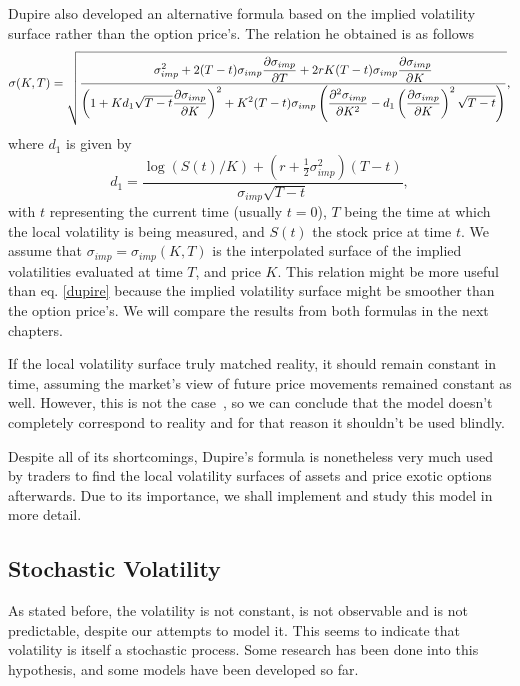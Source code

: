 Dupire also developed an alternative formula based on the implied volatility surface rather than the option price's.
The relation he obtained is as follows
\begin{equation}\label{dupire2}
\sigma(K,T)=\sqrt{\frac{\displaystyle\sigma_{imp}^2+2(T-t)\sigma_{imp}\pdv{\sigma_{imp}}{T}+2rK(T-t)\sigma_{imp}\pdv{\sigma_{imp}}{K}}{\displaystyle\left(1+Kd_1\sqrt{T-t}\pdv{\sigma_{imp}}{K}\right)^2+K^2(T-t)\sigma_{imp}\left(\pdv{^2\sigma_{imp}}{K^2}-d_1\left(\pdv{\sigma_{imp}}{K}\right)^2\sqrt{T-t}\right)}},
\end{equation}
\noindent where $d_1$ is given by
\begin{equation}
d_1=\frac{\log(S(t)/K)+\left(r+\frac{1}{2}\sigma_{imp}^2\right)(T-t)}{\sigma_{imp}\sqrt{T-t}},
\end{equation}
\noindent with $t$ representing the current time (usually $t=0$), $T$ being the time at which the local volatility is being measured, and $S(t)$ the stock price at time $t$. We assume that $\sigma_{imp}=\sigma_{imp}(K,T)$ is the interpolated surface of the implied volatilities evaluated at time $T$, and price $K$.
This relation might be more useful than eq. \eqref{dupire} because the implied volatility surface might be smoother than the option price's. We will compare the results from both formulas in the next chapters.


If the local volatility surface truly matched reality, it should remain constant in time, assuming the market's view of future price movements remained constant as well. However, this is not the case~\cite{Wilmott}, so we can conclude that the model doesn't completely correspond to reality and for that reason it shouldn't be used blindly.

Despite all of its shortcomings, Dupire's formula is nonetheless very much used by traders to find the local volatility surfaces of assets and price exotic options afterwards. Due to its importance, we shall implement and study this model in more detail.


\subsection{Stochastic Volatility}
\label{subsection:stochastic volatility}
As stated before, the volatility is not constant, is not observable and is not predictable, despite our attempts to model it. This seems to indicate that volatility is itself a stochastic process. Some research has been done into this hypothesis, and some models have been developed so far.

